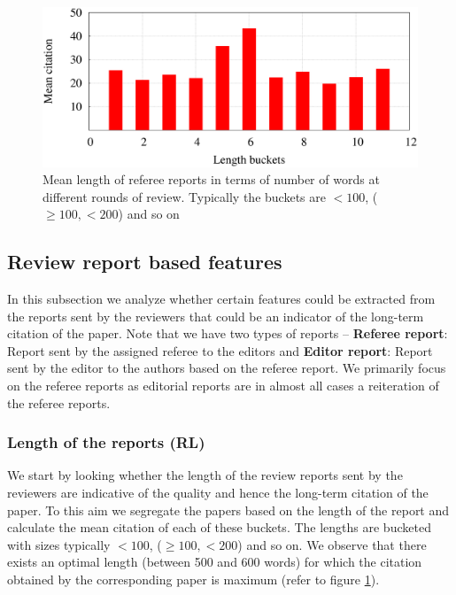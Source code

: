 \begin{figure}
\centering
\includegraphics[scale=0.25]{./texfiles/Chapter_4/jcdl/figures/len_citation.eps}
\caption{Mean length of referee reports in terms of number of words at different rounds of review. Typically the buckets are $< 100$, ($\geq 100, < 200$) and so on}
\label{fig:length}
\end{figure}


\subsection{Review report based features}
\label{text_analysis}

In this subsection we analyze whether certain features could be extracted from the reports sent by the reviewers that could be an indicator of the long-term citation of the paper. Note that we have two types of reports -- {\bf Referee report}: Report sent by the assigned referee to the editors and {\bf Editor report}: Report sent by the editor to the authors based on the referee report. We primarily focus on the referee reports as editorial reports are in almost all cases a reiteration of the referee reports.

\subsubsection{Length of the reports (RL)}
We start by looking whether the length of the review reports sent by the reviewers are indicative of the quality and hence the long-term citation of the paper. To this aim we segregate the papers based on the length of the report and calculate the mean citation of each of these buckets. The lengths are bucketed with sizes typically $< 100$, ($\geq 100, < 200$) and so on. We observe that there exists an optimal length (between 500 and 600 words) for which the citation obtained by the corresponding paper is maximum  (refer to figure \ref{fig:length}). 


